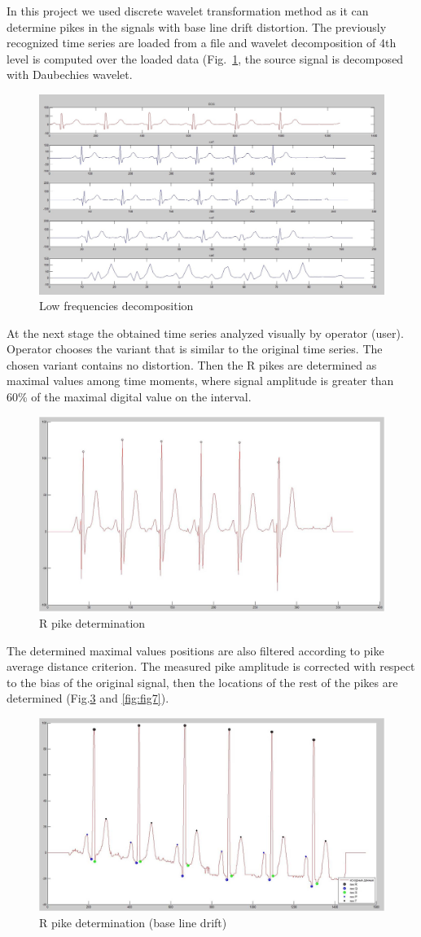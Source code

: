 \documentclass[runningheads]{AIIT}
\newcommand{\nnn}[2][rcolor]{\noindent%
\textcolor{eclr}{}\textcolor{#1}{#2}\textcolor{eclr}{}}
\begin{document}
In this project we used discrete wavelet transformation method as it can determine pikes in the signals with base line drift distortion.  The previously recognized time series are loaded from a file and wavelet decomposition of \nnn{4th level} is computed over the loaded data (Fig.~\ref{fig:decomp}, the source signal is decomposed with Daubechies wavelet.

\begin{figure}[htb]
  \centering
    \includegraphics[width=0.5\linewidth] {images/Decomposition.jpg}
  \caption{Low frequencies decomposition}
  \label{fig:decomp}
\end{figure}

At the next stage the obtained time series analyzed visually by operator (user).  Operator chooses the variant that is similar to the original time series.  The chosen variant contains no distortion.  Then the R pikes are determined as maximal values among time moments, where signal amplitude is greater than 60\% of the maximal digital value on the interval.

\begin{figure}[htb]
  \centering
    \includegraphics[width=0.5\linewidth] {images/R-pike.jpg}
  \caption{R pike determination}
  \label{fig:determ-R}
\end{figure}
The determined maximal values positions are also filtered according to pike average distance criterion.  The measured pike amplitude is corrected with respect to the bias of the original signal, then the locations of the rest of the pikes are determined (Fig.\ref{fig:fig6} and \ref{fig:fig7}).

\begin{figure}[htb]
  \centering
    \includegraphics[width=0.5\linewidth] {images/Drift.jpg}
  \caption{R pike determination (base line drift)}
  \label{fig:fig6}
\end{figure}
\end{document}
